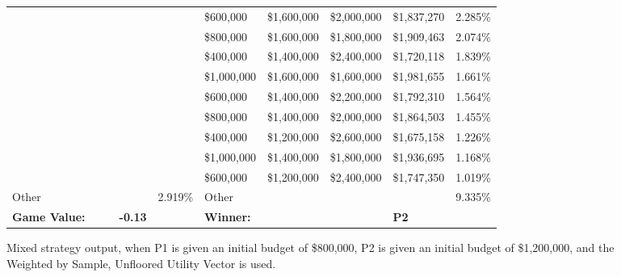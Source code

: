 \documentclass[11pt]{article}
\begin{document}
\begin{figure}
\begin{tabular}{ |p{1.0cm}p{1.0cm}p{1.0cm}p{2.0cm}|p{1.0cm}||p{1.0cm}p{1.0cm}p{1.0cm}p{2.0cm}|p{1.0cm}|}
&&&& & \$600,000 & \$1,600,000 & \$2,000,000 & \$1,837,270 & 2.285\% \\
&&&& & \$800,000 & \$1,600,000 & \$1,800,000 & \$1,909,463 & 2.074\% \\
&&&& & \$400,000 & \$1,400,000 & \$2,400,000 & \$1,720,118 & 1.839\% \\
&&&& & \$1,000,000 & \$1,600,000 & \$1,600,000 & \$1,981,655 & 1.661\% \\
&&&& & \$600,000 & \$1,400,000 & \$2,200,000 & \$1,792,310 & 1.564\% \\
&&&& & \$800,000 & \$1,400,000 & \$2,000,000 & \$1,864,503 & 1.455\% \\
&&&& & \$400,000 & \$1,200,000 & \$2,600,000 & \$1,675,158 & 1.226\% \\
&&&& & \$1,000,000 & \$1,400,000 & \$1,800,000 & \$1,936,695 & 1.168\% \\
&&&& & \$600,000 & \$1,200,000 & \$2,400,000 & \$1,747,350 & 1.019\% \\
\hline
Other &&&& 2.919\% & Other &&&& 9.335\% \\
\hline
\small \textbf{Game Value:} &&& \small \textbf{-0.13} && \small \textbf{Winner:} &&& \small \textbf{P2}&\\
\hline
\end{tabular}
\caption{Mixed strategy output, when P1 is given an initial budget of \$800,000, P2 is given an initial budget of \$1,200,000, and the Weighted by Sample, Unfloored Utility Vector is used.}
\label{8v12table.6}
\end{figure}
\end{document}
